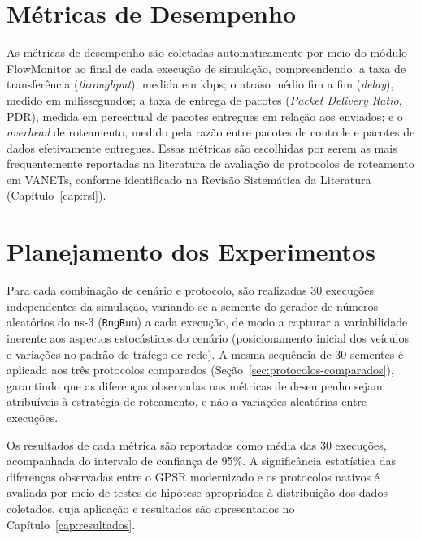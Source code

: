 \section{Métricas de Desempenho}
\label{sec:metricas}

As métricas de desempenho são coletadas automaticamente por meio do módulo FlowMonitor
\cite{carneiro2009flowmonitor} ao final de cada execução de simulação, compreendendo: a taxa
de transferência (\textit{throughput}), medida em kbps; o atraso médio fim a fim
(\textit{delay}), medido em milissegundos; a taxa de entrega de pacotes (\textit{Packet
Delivery Ratio}, PDR), medida em percentual de pacotes entregues em relação aos enviados; e o
\textit{overhead} de roteamento, medido pela razão entre pacotes de controle e pacotes de
dados efetivamente entregues. Essas métricas são escolhidas por serem as mais frequentemente
reportadas na literatura de avaliação de protocolos de roteamento em VANETs, conforme
identificado na Revisão Sistemática da Literatura (Capítulo~\ref{cap:rsl}).

\section{Planejamento dos Experimentos}
\label{sec:planejamento}

Para cada combinação de cenário e protocolo, são realizadas 30 execuções independentes da
simulação, variando-se a semente do gerador de números aleatórios do ns-3
(\texttt{RngRun}) a cada execução, de modo a capturar a variabilidade inerente aos aspectos
estocásticos do cenário (posicionamento inicial dos veículos e variações no padrão de
tráfego de rede). A mesma sequência de 30 sementes é aplicada aos três protocolos
comparados (Seção~\ref{sec:protocolos-comparados}), garantindo que as diferenças observadas
nas métricas de desempenho sejam atribuíveis à estratégia de roteamento, e não a variações
aleatórias entre execuções.

Os resultados de cada métrica são reportados como média das 30 execuções, acompanhada do
intervalo de confiança de 95\%. A significância estatística das diferenças observadas entre
o GPSR modernizado e os protocolos nativos é avaliada por meio de testes de hipótese
apropriados à distribuição dos dados coletados, cuja aplicação e resultados são apresentados
no Capítulo~\ref{cap:resultados}.